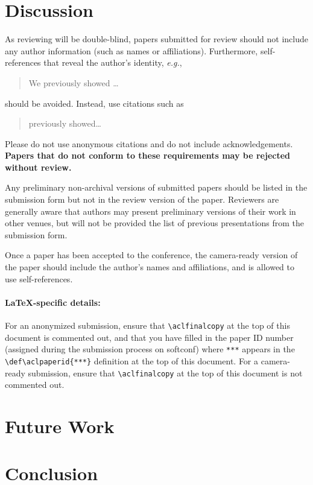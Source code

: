 \documentclass[11pt,a4paper]{article}
\begin{document}
\section{Discussion}
As reviewing will be double-blind, papers submitted for review should not include any author information (such as names or affiliations). Furthermore, self-references that reveal the author's identity, \emph{e.g.},
\begin{quote}
We previously showed \citep{Gusfield:97} \ldots
\end{quote}
should be avoided. Instead, use citations such as 
\begin{quote}
\citet{Gusfield:97} previously showed\ldots
\end{quote}
Please do not use anonymous citations and do not include acknowledgements.
\textbf{Papers that do not conform to these requirements may be rejected without review.}

Any preliminary non-archival versions of submitted papers should be listed in the submission form but not in the review version of the paper.
Reviewers are generally aware that authors may present preliminary versions of their work in other venues, but will not be provided the list of previous presentations from the submission form.

Once a paper has been accepted to the conference, the camera-ready version of the paper should include the author's names and affiliations, and is allowed to use self-references.

\paragraph{\LaTeX-specific details:}
For an anonymized submission, ensure that {\small\verb|\aclfinalcopy|} at the top of this document is commented out, and that you have filled in the paper ID number (assigned during the submission process on softconf) where {\small\verb|***|} appears in the {\small\verb|\def\aclpaperid{***}|} definition at the top of this document.
For a camera-ready submission, ensure that {\small\verb|\aclfinalcopy|} at the top of this document is not commented out.


\section{Future Work}


\section{Conclusion}
\end{document}

